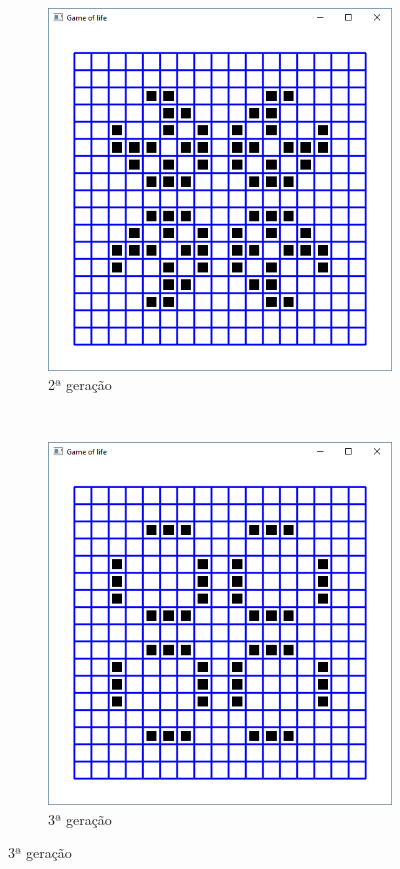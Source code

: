 \begin{enumerate}
\begin{figure}[!htp]
\begin{subfigure}[t]{0.3\textwidth}
        \centerline{\includegraphics[width=.9\textwidth]{img/cap2_ex9b.png}}
        \caption{2ª geração}
        \label{fig:cap03_ex9a}
    \end{subfigure}
    ~
    \begin{subfigure}[t]{0.3\textwidth}
        \centerline{\includegraphics[width=.9\textwidth]{img/cap2_ex9c.png}}
        \caption{3ª geração}
        \label{fig:cap03_ex9a}
    \end{subfigure}
  \end{figure}


\end{enumerate}
